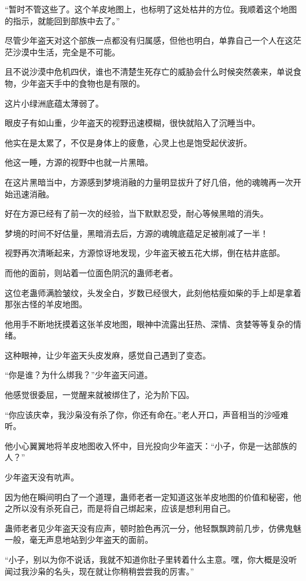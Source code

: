 \begin{this_body}
“暂时不管这些了。这个羊皮地图上，也标明了这处枯井的方位。我顺着这个地图的指示，就能回到部族中去了。”

尽管少年盗天对这个部族一点都没有归属感，但他也明白，单靠自己一个人在这茫茫沙漠中生活，完全是不可能。

且不说沙漠中危机四伏，谁也不清楚生死存亡的威胁会什么时候突然袭来，单说食物，少年盗天手中的食物也是有限的。

这片小绿洲底蕴太薄弱了。

眼皮子有如山重，少年盗天的视野迅速模糊，很快就陷入了沉睡当中。

他实在是太累了，不仅是身体上的疲惫，心灵上也是饱受起伏波折。

他这一睡，方源的视野中也就一片黑暗。

在这片黑暗当中，方源感到梦境消融的力量明显拔升了好几倍，他的魂魄再一次开始迅速消融。

好在方源已经有了前一次的经验，当下默默忍受，耐心等候黑暗的消失。

梦境的时间不好估量，黑暗消去后，方源的魂魄底蕴足足被削减了一半！

视野再次清晰起来，方源惊讶地发现，少年盗天被五花大绑，倒在枯井底部。

而他的面前，则站着一位面色阴沉的蛊师老者。

这位老蛊师满脸皱纹，头发全白，岁数已经很大，此刻他枯瘦如柴的手上却是拿着那张古怪的羊皮地图。

他用手不断地抚摸着这张羊皮地图，眼神中流露出狂热、深情、贪婪等等复杂的情绪。

这种眼神，让少年盗天头皮发麻，感觉自己遇到了变态。

“你是谁？为什么绑我？”少年盗天问道。

他感觉很委屈，一觉醒来就被绑住了，沦为阶下囚。

“你应该庆幸，我沙枭没有杀了你，你还有命在。”老人开口，声音相当的沙哑难听。

他小心翼翼地将羊皮地图收入怀中，目光投向少年盗天：“小子，你是一达部族的人？”

少年盗天没有吭声。

因为他在瞬间明白了一个道理，蛊师老者一定知道这张羊皮地图的价值和秘密，他之所以没有杀死自己，而是将自己绑起来，应该是想利用自己。

蛊师老者见少年盗天没有应声，顿时脸色再沉一分，他轻飘飘跨前几步，仿佛鬼魅一般，毫无声息地站到少年盗天的面前。

“小子，别以为你不说话，我就不知道你肚子里转着什么主意。嘿，你大概是没听闻过我沙枭的名头，现在就让你稍稍尝尝我的厉害。”


\end{this_body}
